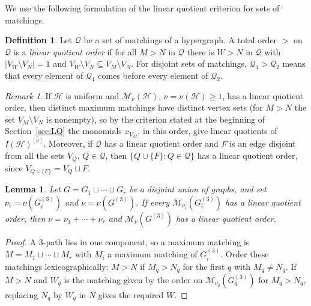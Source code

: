 \documentclass{amsart}
\newtheorem{Lemma}[Theorem]{Lemma}
\theoremstyle{definition}
\newtheorem{Definition}[Theorem]{Definition}
\theoremstyle{remark}
\newtheorem{Remark}[Theorem]{Remark}
\begin{document}
We use the following formulation of the linear quotient criterion
for sets of matchings.

\begin{Definition}\label{def:matching-order}
Let $\mathcal Q$ be a set of matchings of a hypergraph. A total order $>$ on $\mathcal Q$ is a \emph{linear quotient order} if for all $M>N$ in $\mathcal Q$ there is $W>N$ in $\mathcal Q$ with $|V_W\setminus V_N|=1$ and $V_W\setminus V_N\subseteq V_M\setminus V_N$. For disjoint sets of matchings, $\mathcal Q_1>\mathcal Q_2$ means that every element of $\mathcal Q_1$ comes before every element of $\mathcal Q_2$.
\end{Definition}

\begin{Remark}\label{rem:lqo-ideal}
If $\mathcal H$ is uniform and $\mathcal M_\nu(\mathcal H)$, $\nu=\nu(\mathcal H)\geq 1$, has a linear quotient order, then distinct maximum matchings have distinct vertex sets (for $M>N$ the set $V_M\setminus V_N$ is nonempty), so by the criterion stated at the beginning of Section~\ref{sec:LQ} the monomials $x_{V_M}$, in this order, give linear quotients of $I(\mathcal H)^{[\nu]}$. Moreover, if $\mathcal Q$ has a linear quotient order and $F$ is an edge disjoint from all the sets $V_Q$, $Q\in\mathcal Q$, then $\{Q\cup\{F\}:Q\in\mathcal Q\}$ has a linear quotient order, since $V_{Q\cup\{F\}}=V_Q\sqcup F$.
\end{Remark}

\begin{Lemma}\label{lemma.lq}
Let $G=G_1\sqcup\cdots\sqcup G_r$ be a disjoint union of graphs, and set
$\nu_i=\nu(G_i^{(3)})$ and $\nu=\nu(G^{(3)})$.
If every $\mathcal M_{\nu_i}(G_i^{(3)})$ has a linear quotient order,
then $\nu=\nu_1+\cdots+\nu_r$ and
$\mathcal M_\nu(G^{(3)})$ has a linear quotient order.
\end{Lemma}

\begin{proof}
A $3$-path lies in one component, so a maximum matching is $M=M_1\sqcup\cdots\sqcup M_r$ with $M_i$ a maximum matching of $G_i^{(3)}$. Order these matchings lexicographically: $M>N$ if $M_q>N_q$ for the first $q$ with $M_q\neq N_q$. If $M>N$ and $W_q$ is the matching given by the order on $\mathcal M_{\nu_q}(G_q^{(3)})$ for $M_q>N_q$, replacing $N_q$ by $W_q$ in $N$ gives the required $W$.
\end{proof}
\end{document}
